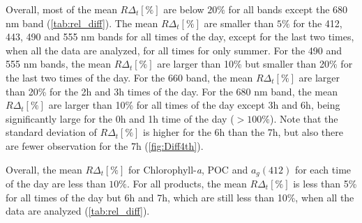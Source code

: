 \documentclass[onecolumn,3p,letterpaper,11pt]{elsarticle}
\begin{document}
Overall, most of the mean $R\Delta_t[\%]$ are below $20\%$ for all bands except the 680 nm band (\autoref{tab:rel_diff}). 
The mean $R\Delta_t[\%]$ are smaller than $5\%$ for the 412, 443, 490 and 555 nm bands for all times of the day, except for the last two times, when all the data are analyzed, for all times for only summer. 
For the 490 and 555 nm bands, the mean $R\Delta_t[\%]$ are larger than 10\% but smaller than 20\% for the last two times of the day. 
For the 660 band, the mean $R\Delta_t[\%]$ are larger than 20\% for the 2h and 3h times of the day. 
For the 680 nm band, the mean $R\Delta_t[\%]$ are larger than 10\% for all times of the day except 3h and 6h, being significantly large for the 0h and 1h time of the day ($>100\%$).
Note that the standard deviation of $R\Delta_t[\%]$ is higher for the 6h than the 7h, but also there are fewer observation for the 7h (\autoref{fig:Diff4th}).

Overall, the mean $R\Delta_t[\%]$ for Chlorophyll-{\it a}, POC and $a_g(412)$ for each time of the day are less than $10\%$. For all products, the mean $R\Delta_t[\%]$ is less than 5\% for all times of the day but 6h and 7h, which are still less than 10\%, when all the data are analyzed (\autoref{tab:rel_diff}).
\end{document}
